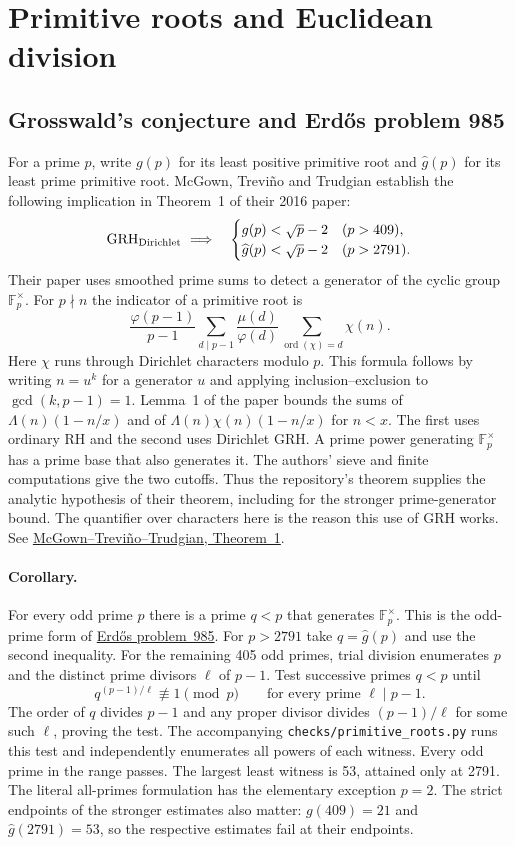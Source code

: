 \section{Primitive roots and Euclidean division}

\subsection{Grosswald's conjecture and Erd\H{o}s problem 985}
For a prime $p$, write $g(p)$ for its least positive primitive root and $\widehat g(p)$ for its least prime primitive root. McGown, Trevi\~no and Trudgian establish the following implication in Theorem~1 of their 2016 paper:
\[
 \mathrm{GRH}_{\rm Dirichlet}\ \Longrightarrow\quad
 \begin{cases}
 g(p)<\sqrt{p}-2 & (p>409),\\
 \widehat g(p)<\sqrt{p}-2 & (p>2791).
 \end{cases}
\]
Their paper uses smoothed prime sums to detect a generator of the cyclic group $\mathbb F_p^\times$. For $p\nmid n$ the indicator of a primitive root is
\[
 \frac{\varphi(p-1)}{p-1}
 \sum_{d\mid p-1}\frac{\mu(d)}{\varphi(d)}
                 \sum_{\operatorname{ord}(\chi)=d}\chi(n).
\]
Here $\chi$ runs through Dirichlet characters modulo $p$. This formula follows by writing $n=u^k$ for a generator $u$ and applying inclusion--exclusion to $\gcd(k,p-1)=1$. Lemma~1 of the paper bounds the sums of $\Lambda(n)(1-n/x)$ and of $\Lambda(n)\chi(n)(1-n/x)$ for $n<x$. The first uses ordinary RH and the second uses Dirichlet GRH. A prime power generating $\mathbb F_p^\times$ has a prime base that also generates it. The authors' sieve and finite computations give the two cutoffs. Thus the repository's theorem supplies the analytic hypothesis of their theorem, including for the stronger prime-generator bound. The quantifier over characters here is the reason this use of GRH works. See \href{https://doi.org/10.7169/facm/2016.55.2.5}{McGown--Trevi\~no--Trudgian, Theorem~1}.

\paragraph{Corollary.}
For every odd prime $p$ there is a prime $q<p$ that generates $\mathbb F_p^\times$. This is the odd-prime form of \href{https://www.erdosproblems.com/985}{Erd\H{o}s problem~985}. For $p>2791$ take $q=\widehat g(p)$ and use the second inequality. For the remaining 405 odd primes, trial division enumerates $p$ and the distinct prime divisors $\ell$ of $p-1$. Test successive primes $q<p$ until
\[
      q^{(p-1)/\ell}\not\equiv1\pmod p
      \qquad\text{for every prime }\ell\mid p-1.
\]
The order of $q$ divides $p-1$ and any proper divisor divides $(p-1)/\ell$ for some such $\ell$, proving the test. The accompanying \texttt{checks/primitive\_roots.py} runs this test and independently enumerates all powers of each witness. Every odd prime in the range passes. The largest least witness is 53, attained only at 2791. The literal all-primes formulation has the elementary exception $p=2$. The strict endpoints of the stronger estimates also matter: $g(409)=21$ and $\widehat g(2791)=53$, so the respective estimates fail at their endpoints.

